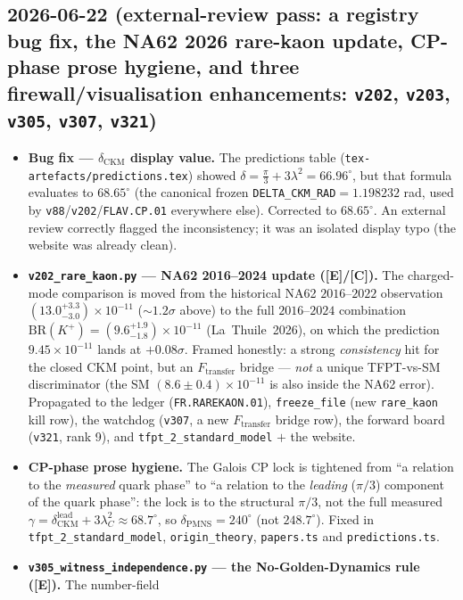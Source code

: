 \documentclass[11pt]{article}
\providecommand{\mE}{\textbf{[E]}}\providecommand{\mC}{\textbf{[C]}}
\begin{document}
\subsection*{2026-06-22 (external-review pass: a registry bug fix, the NA62 2026 rare-kaon update, CP-phase prose hygiene, and three firewall/visualisation enhancements: \texttt{v202}, \texttt{v203}, \texttt{v305}, \texttt{v307}, \texttt{v321})}
\begin{itemize}
\item \textbf{Bug fix --- $\delta_{\mathrm{CKM}}$ display value.} The predictions table (\texttt{tex-artefacts/predictions.tex})
  showed $\delta=\tfrac\pi3+3\lambda^2=66.96^\circ$, but that formula evaluates to $68.65^\circ$ (the canonical
  frozen \texttt{DELTA\_CKM\_RAD}$=1.198232$ rad, used by \texttt{v88}/\texttt{v202}/\texttt{FLAV.CP.01}
  everywhere else). Corrected to $68.65^\circ$. An external review correctly flagged the inconsistency; it was an
  isolated display typo (the website was already clean).
\item \textbf{\texttt{v202\_rare\_kaon.py} --- NA62 2016--2024 update (\mE/\mC).} The charged-mode comparison is
  moved from the historical NA62 $2016$--$2022$ observation $(13.0^{+3.3}_{-3.0})\times10^{-11}$ ($\sim1.2\sigma$
  above) to the full $2016$--$2024$ combination $\mathrm{BR}(K^+)=(9.6^{+1.9}_{-1.8})\times10^{-11}$
  (La~Thuile~2026), on which the prediction $9.45\times10^{-11}$ lands at $+0.08\sigma$. Framed honestly: a strong
  \emph{consistency} hit for the closed CKM point, but an $F_{\mathrm{transfer}}$ bridge --- \emph{not} a unique
  TFPT-vs-SM discriminator (the SM $(8.6\pm0.4)\times10^{-11}$ is also inside the NA62 error). Propagated to the
  ledger (\texttt{FR.RAREKAON.01}), \texttt{freeze\_file} (new \texttt{rare\_kaon} kill row), the watchdog
  (\texttt{v307}, a new $F_{\mathrm{transfer}}$ bridge row), the forward board (\texttt{v321}, rank 9), and
  \texttt{tfpt\_2\_standard\_model} $+$ the website.
\item \textbf{CP-phase prose hygiene.} The Galois CP lock is tightened from ``a relation to the \emph{measured}
  quark phase'' to ``a relation to the \emph{leading} ($\pi/3$) component of the quark phase'': the lock is to the
  structural $\pi/3$, not the full measured $\gamma=\delta_{\mathrm{CKM}}^{\mathrm{lead}}+3\lambda_C^2\approx68.7^\circ$,
  so $\delta_{\mathrm{PMNS}}=240^\circ$ (not $248.7^\circ$). Fixed in \texttt{tfpt\_2\_standard\_model},
  \texttt{origin\_theory}, \texttt{papers.ts} and \texttt{predictions.ts}.
\item \textbf{\texttt{v305\_witness\_independence.py} --- the No-Golden-Dynamics rule (\mE).} The number-field

\end{itemize}
\end{document}
